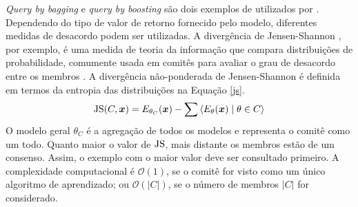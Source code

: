 \textit{Query by bagging}
e
\textit{query by boosting}
são dois exemplos de  utilizados por .
Dependendo do tipo de valor de retorno fornecido pelo modelo, diferentes medidas de desacordo podem ser utilizadas.
A divergência de Jensen-Shannon \cite{journals/tit/Lin91}, por exemplo,
é uma medida de teoria da informação que compara distribuições de 
probabilidade, comumente usada em comitês para avaliar o grau de
desacordo entre os membros \cite{conf/icml/MelvilleM04}.
A divergência não-ponderada de Jensen-Shannon é definida em termos da
entropia das distribuições na Equação \ref{js}.
\begin{equation}\label{js}
\operatorname*{JS}(C,\bm{x})=E_{\theta_{C}}(\bm{x})-\sum{\langle E_{\theta}(\bm{x}) \mid \theta \in C \rangle}
\end{equation}
O modelo geral $\theta_{C}$ é a agregação de todos os modelos e representa o comitê como um todo.
Quanto maior o valor de $\operatorname*{JS}$, mais distante os membros estão de um consenso.
Assim, o exemplo com o maior valor deve ser consultado primeiro.
A complexidade computacional é $\mathcal{O}(1)$,
se o comitê for visto como um único algoritmo de aprendizado;
ou $\mathcal{O}(|C|)$, se o número de membros $|C|$ for considerado.


